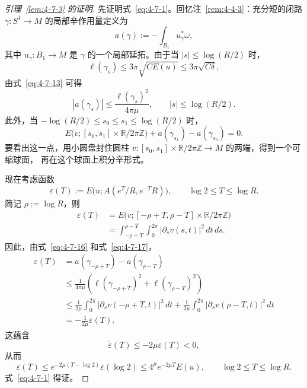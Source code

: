\begin{proof}[引理~\ref{lem:4-7-3} 的证明]
先证明式~\eqref{eq:4-7-1}。回忆注~\ref{rem:4-4-3}：充分短的闭路
$\gamma:S^1\to M$ 的局部辛作用量定义为
\[
  a(\gamma):=-\int_{B_1}u_\gamma^*\omega,
\]
其中 $u_\gamma:B_1\to M$ 是 $\gamma$ 的一个局部延拓。由于当
$|s|\le\log(R/2)$ 时，
\[
  \ell(\gamma_s)\le3\pi\sqrt{CE(u)}
  \le3\pi\sqrt{C\delta},
\]
由式~\eqref{eq:4-7-13} 可得
\begin{equation}\label{eq:4-7-16}
  |a(\gamma_s)|\le\frac{\ell(\gamma_s)^2}{4\pi\mu},
  \qquad |s|\le\log(R/2).
\end{equation}
此外，当
$-\log(R/2)\le s_0\le s_1\le\log(R/2)$ 时，
\begin{equation}\label{eq:4-7-17}
  E\bigl(v;[s_0,s_1]\times\mathbb R/2\pi\mathbb Z\bigr)
  +a(\gamma_{s_1})-a(\gamma_{s_0})=0.
\end{equation}
要看出这一点，用小圆盘封住圆柱
$v:[s_0,s_1]\times\mathbb R/2\pi\mathbb Z\to M$ 的两端，得到一个可缩球面，
再在这个球面上积分辛形式。

现在考虑函数
\[
  \varepsilon(T):=E\bigl(u;A(e^T/R,e^{-T}R)\bigr),
  \qquad \log2\le T\le\log R.
\]
简记 $\rho:=\log R$，则
\[
  \begin{aligned}
  \varepsilon(T)
  &=E\bigl(v;[-\rho+T,\rho-T]\times\mathbb R/2\pi\mathbb Z\bigr)\\
  &=\int_{-\rho+T}^{\rho-T}\int_0^{2\pi}
    |\partial_sv(s,t)|^2\,dt\,ds.
  \end{aligned}
\]
因此，由式~\eqref{eq:4-7-16} 和式~\eqref{eq:4-7-17}，
\[
  \begin{aligned}
  \varepsilon(T)
  &=a(\gamma_{-\rho+T})-a(\gamma_{\rho-T})\\
  &\le\frac1{4\pi\mu}
    \left(\ell(\gamma_{-\rho+T})^2
    +\ell(\gamma_{\rho-T})^2\right)\\
  &\le\frac1{2\mu}\int_0^{2\pi}
    |\partial_sv(-\rho+T,t)|^2\,dt
    +\frac1{2\mu}\int_0^{2\pi}
    |\partial_sv(\rho-T,t)|^2\,dt\\
  &=-\frac1{2\mu}\dot\varepsilon(T).
  \end{aligned}
\]
这蕴含
\[
  \dot\varepsilon(T)\le-2\mu\varepsilon(T)<0,
\]
从而
\begin{equation}\label{eq:4-7-18}
  \varepsilon(T)
  \le e^{-2\mu(T-\log2)}\varepsilon(\log2)
  \le4^\mu e^{-2\mu T}E(u),
  \qquad \log2\le T\le\log R.
\end{equation}
式~\eqref{eq:4-7-1} 得证。


\end{proof}

